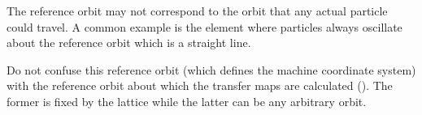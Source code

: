 The reference orbit may not correspond to the orbit that any actual particle could travel.
A common example is the  element where particles always oscillate about the reference
orbit which is a straight line.

Do not confuse this reference orbit (which defines the machine coordinate system) with the reference
orbit about which the transfer maps are calculated (). The former is fixed by the
lattice while the latter can be any arbitrary orbit.
